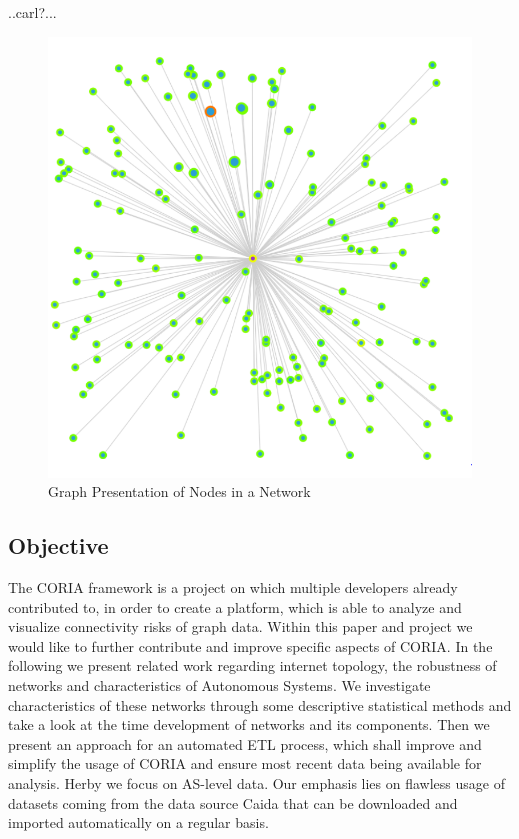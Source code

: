 \documentclass[conference, 11pt]{IEEEtran}
\begin{document}
..carl?... \\ 

 

\begin{figure}[htbp]
\centerline{\includegraphics[scale=0.2]{Graphics/nodePresentaion.PNG}}
\caption{Graph Presentation of Nodes in a Network}
\label{fig}
\end{figure}



\subsection{Objective}
The CORIA framework is a project on which multiple developers already contributed to, in order to create a platform, which is able to analyze and visualize connectivity risks of graph data\cite{CoriaPaper}. Within this paper and project we would like to further contribute and improve specific aspects of CORIA. In the following we present related work regarding internet topology, the robustness of networks and characteristics of Autonomous Systems. We investigate characteristics of these networks through some descriptive statistical methods and take a look at the time development of networks and its components. Then we present an approach for an automated ETL process, which shall improve and simplify the usage of CORIA and ensure most recent data being available for analysis. Herby we focus on AS-level data. Our emphasis lies on flawless usage of datasets coming from the data source Caida that can be downloaded and imported automatically on a regular basis. \\
\end{document}

